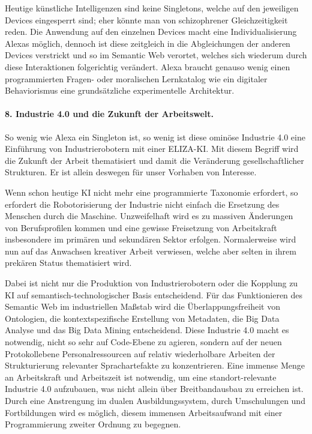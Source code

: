 \documentclass[a4paper,11pt]{article}
\begin{document}
Heutige künstliche Intelligenzen sind keine Singletons, welche auf den
jeweiligen Devices eingesperrt sind; eher könnte man von schizophrener
Gleichzeitigkeit reden. Die Anwendung auf den einzelnen Devices macht eine
Individualisierung Alexas möglich, dennoch ist diese zeitgleich in die
Abgleichungen der anderen Devices verstrickt und so im Semantic Web verortet,
welches sich wiederum durch diese Interaktionen folgerichtig verändert. Alexa
braucht genauso wenig einen programmierten Fragen- oder moralischen
Lernkatalog wie ein digitaler Behaviorismus eine grundsätzliche experimentelle
Architektur.

\paragraph{8. Industrie 4.0 und die Zukunft der Arbeitswelt.}

So wenig wie Alexa ein Singleton ist, so wenig ist diese ominöse Industrie 4.0
eine Einführung von Industrierobotern mit einer ELIZA-KI. Mit diesem Begriff
wird die Zukunft der Arbeit thematisiert und damit die Veränderung
gesellschaftlicher Strukturen. Er ist allein deswegen für unser Vorhaben von
Interesse.

Wenn schon heutige KI nicht mehr eine programmierte Taxonomie erfordert, so
erfordert die Robotorisierung der Industrie nicht einfach die Ersetzung des
Menschen durch die Maschine. Unzweifelhaft wird es zu massiven Änderungen von
Berufsprofilen kommen und eine gewisse Freisetzung von Arbeitskraft
insbesondere im primären und sekundären Sektor erfolgen.  Normalerweise wird
nun auf das Anwachsen kreativer Arbeit verwiesen, welche aber selten in ihrem
prekären Status thematisiert wird.

Dabei ist nicht nur die Produktion von Industrierobotern oder die Kopplung zu
KI auf semantisch-technologischer Basis entscheidend. Für das Funktionieren
des Semantic Web im industriellen Maßstab wird die Überlappungsfreiheit von
Ontologien, die kontextspezifische Erstellung von Metadaten, die Big Data
Analyse und das Big Data Mining entscheidend.  Diese Industrie 4.0 macht es
notwendig, nicht so sehr auf Code-Ebene zu agieren, sondern auf der neuen
Protokollebene Personalressourcen auf relativ wiederholbare Arbeiten der
Strukturierung relevanter Sprachartefakte zu konzentrieren. Eine immense Menge
an Arbeitskraft und Arbeitszeit ist notwendig, um eine standort-relevante
Industrie 4.0 aufzubauen, was nicht allein über Breitbandausbau zu erreichen
ist.  Durch eine Anstrengung im dualen Ausbildungssystem, durch Umschulungen
und Fortbildungen wird es möglich, diesem immensen Arbeitsaufwand mit einer
Programmierung zweiter Ordnung zu begegnen.
\end{document}
